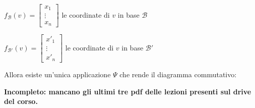 $f_{\mathcal{B}}(v)=\begin{bmatrix}x_1\\\vdots\\x_n\end{bmatrix}$ le coordinate di $v$ in base $\mathcal{B}$

$f_{\mathcal{B}'}(v)=\begin{bmatrix}x'_1\\\vdots\\x'_n\end{bmatrix}$ le coordinate di $v$ in base $\mathcal{B}'$

Allora esiste un'unica applicazione $\Psi$ che rende il diagramma commutativo:


\textbf{Incompleto: mancano gli ultimi tre pdf delle lezioni presenti sul drive del corso.}